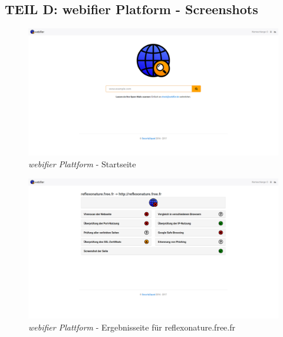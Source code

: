 \begin{landscape}

\section*{TEIL D: webifier Platform - Screenshots}
\label{app:d}

\begin{figure}[H]
  \centering
  \includegraphics[width=\textheight]{images/platform/screenshot-start}
  \caption{\textit{webifier Plattform} - Startseite}
\end{figure}

\begin{figure}[H]
  \centering
  \includegraphics[width=\textheight]{images/platform/screenshot-reflexonature}
  \caption{\textit{webifier Plattform} - Ergebnisseite für reflexonature.free.fr}
\end{figure}



\end{landscape}
